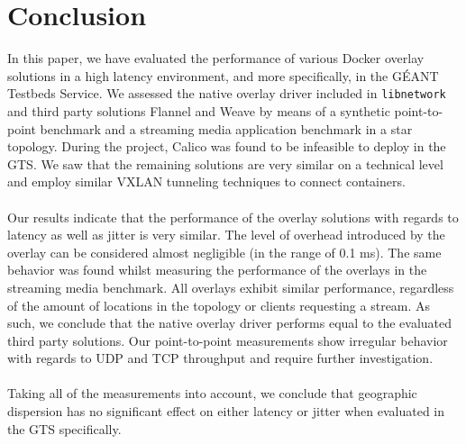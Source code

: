 \section{Conclusion} \label{conclusion}

In this paper, we have evaluated the performance of various Docker overlay solutions in a high latency environment, and more specifically, in the GÉANT Testbeds Service. We assessed the native overlay driver included in \texttt{libnetwork} and third party solutions Flannel and Weave by means of a synthetic point-to-point benchmark and a streaming media application benchmark in a star topology. During the project, Calico was found to be infeasible to deploy in the GTS. We saw that the remaining solutions are very similar on a technical level and employ similar VXLAN tunneling techniques to connect containers. 
\\
\\
Our results indicate that the performance of the overlay solutions with regards to latency as well as jitter is very similar. The level of overhead introduced by the overlay can be considered almost negligible (in the range of 0.1 ms). The same behavior was found whilst measuring the performance of the overlays in the streaming media benchmark. All overlays exhibit similar performance, regardless of the amount of locations in the topology or clients requesting a stream. As such, we conclude that the native overlay driver performs equal to the evaluated third party solutions. Our point-to-point measurements show irregular behavior with regards to UDP and TCP throughput and require further investigation.
\\
\\
Taking all of the measurements into account, we conclude that geographic dispersion has no significant effect on either latency or jitter when evaluated in the GTS specifically. 

